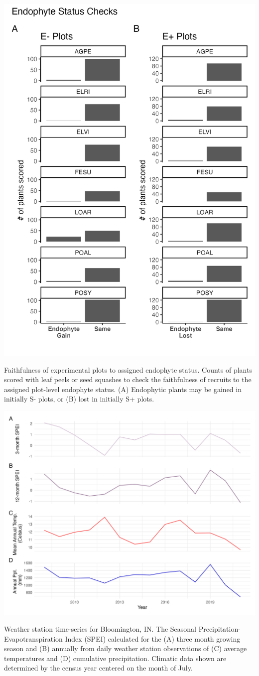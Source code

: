 \documentclass[lineno, sn-basic]{sn-jnl}%
\begin{document}
\begin{myfigure}[H]
	\centering
	\includegraphics[width=.6\linewidth]{endo_check_plot.png}
	\caption[Faithfulness of experimental plots to assigned endophyte status]{Faithfulness of experimental plots to assigned endophyte status. Counts of plants scored with leaf peels or seed squashes to check the faithfulness of recruits to the assigned plot-level endophyte status. (A) Endophytic plants may be gained in initially S- plots, or (B) lost in initially S+ plots.}
\end{myfigure}



\begin{myfigure}[H]
	\centering
	\includegraphics[width=\linewidth]{climate_plot.png}
	\caption[Weather station time-series for Bloomington, IN]{Weather station time-series for Bloomington, IN. The Seasonal Precipitation-Evapotranspiration Index (SPEI) calculated for the (A) three month growing season and (B) annually from daily weather station observations of (C) average temperatures and (D) cumulative precipitation. Climatic data shown are determined by the census year centered on the month of July.}
\end{myfigure}
\end{document}
